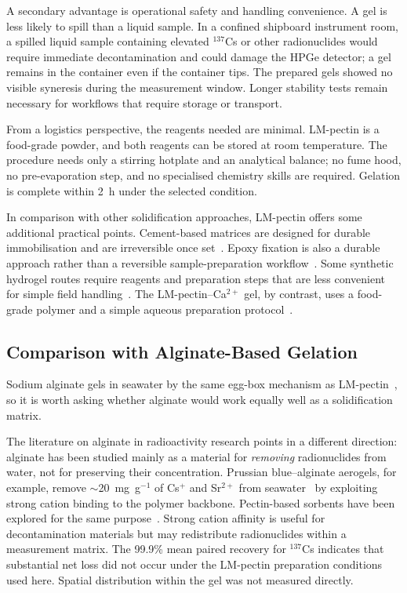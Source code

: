 \documentclass[preprint,12pt]{elsarticle}
\begin{document}
A secondary advantage is operational safety and handling convenience.
A gel is less likely to spill than a liquid sample.
In a confined shipboard instrument room, a spilled liquid sample
containing elevated $^{137}$Cs or other radionuclides would require
immediate decontamination and could damage the HPGe detector; a gel
remains in the container even if the container tips.
The prepared gels showed no visible syneresis during the measurement
window. Longer stability tests remain necessary for workflows that
require storage or transport.

From a logistics perspective, the reagents needed are minimal.
LM-pectin is a food-grade powder, and both reagents can be stored at
room temperature.
The procedure needs only a stirring hotplate and an analytical balance;
no fume hood, no pre-evaporation step, and no specialised chemistry skills
are required.
Gelation is complete within 2~h under the selected condition.

In comparison with other solidification approaches, LM-pectin offers
some additional practical points.
Cement-based matrices are designed for durable immobilisation and are
irreversible once set~\cite{Rahman2007}.
Epoxy fixation is also a durable approach rather than a reversible
sample-preparation workflow~\cite{Costa2021}.
Some synthetic hydrogel routes require reagents and preparation steps
that are less convenient for simple field handling~\cite{Du2020}.
The LM-pectin--Ca$^{2+}$ gel, by contrast, uses a food-grade polymer
and a simple aqueous preparation protocol~\cite{May1990}.

\subsection{Comparison with Alginate-Based Gelation}

Sodium alginate gels in seawater by the same egg-box mechanism as
LM-pectin~\cite{Grant1973, Makarova2023}, so it is worth asking
whether alginate would work equally well as a solidification matrix.

The literature on alginate in radioactivity research points in a
different direction: alginate has been studied mainly as a material
for \emph{removing} radionuclides from water, not for preserving
their concentration.
Prussian blue--alginate aerogels, for example, remove $\sim$20~mg~g$^{-1}$
of Cs$^+$ and Sr$^{2+}$ from seawater~\cite{Eun2021} by exploiting
strong cation binding to the polymer backbone.
Pectin-based sorbents have been explored for the same purpose~\cite{BokBadura2020}.
Strong cation affinity is useful for decontamination materials but may
redistribute radionuclides within a measurement matrix. The 99.9\%
mean paired recovery for $^{137}$Cs indicates that substantial net loss
did not occur under the LM-pectin preparation conditions used here.
Spatial distribution within the gel was not measured directly.
\end{document}
